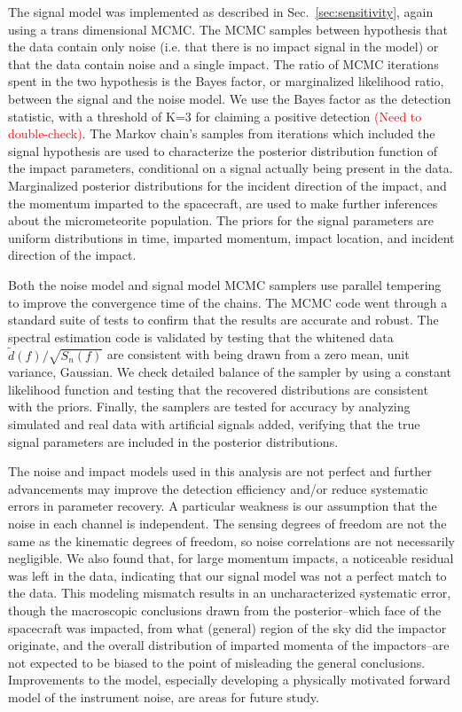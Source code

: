 \documentclass[twocolumn, trackchanges]{aastex62}
\newcommand{\red}[1]{\textcolor{red}{#1}}
\newcommand{\data}{\tilde d}
\begin{document}
The signal model was implemented as described in Sec.~\ref{sec:sensitivity}, again using a trans dimensional MCMC.
The MCMC samples between hypothesis that the data contain only noise (i.e. that there is no impact signal in the model) or that the data contain noise and a single impact.
The ratio of MCMC iterations spent in the two hypothesis is the Bayes factor, or marginalized likelihood ratio, between the signal and the noise model.
We use the Bayes factor as the detection statistic, with a threshold of  K=3 for claiming a positive detection \red{(Need to double-check)}.
The Markov chain's samples from iterations which included the signal hypothesis are used to characterize the posterior distribution function of the impact parameters, conditional on a signal actually being present in the data.
Marginalized posterior distributions for the incident direction of the impact, and the momentum imparted to the spacecraft, are used to make further inferences about the micrometeorite population.
The priors for the signal parameters are uniform distributions in time, imparted momentum, impact location, and incident direction of the impact.  

Both the noise model and signal model MCMC samplers use parallel tempering to improve the convergence time of the chains.
The MCMC code went through a standard suite of tests to confirm that the results are accurate and robust.
The spectral estimation code is validated by testing that the whitened data $\data(f)/\sqrt{S_n(f)}$ are consistent with being drawn from a zero mean, unit variance, Gaussian.
We check detailed balance of the sampler by using a constant likelihood function and testing that the recovered distributions are consistent with the priors.
Finally, the samplers are tested for accuracy by analyzing simulated and real data with artificial signals added, verifying that the true signal parameters are included in the posterior distributions.
 
The noise and impact models used in this analysis are not perfect and further advancements may improve the detection efficiency and/or reduce systematic errors in parameter recovery.
A particular weakness is our assumption that the noise in each channel is independent. 
The sensing degrees of freedom are not the same as the kinematic degrees of freedom, so noise correlations are not necessarily negligible. 
We also found that, for large momentum impacts, a noticeable residual was left in the data, indicating that our signal model was not a perfect match to the data. 
This modeling mismatch results in an uncharacterized systematic error, though the macroscopic conclusions drawn from the posterior--which face of the spacecraft was impacted, from what (general) region of the sky did the impactor originate, and the overall distribution of imparted momenta of the impactors--are not expected to be biased to the point of misleading the general conclusions.
Improvements to the model, especially developing a physically motivated forward model of the instrument noise, are areas for future study.
\end{document}
